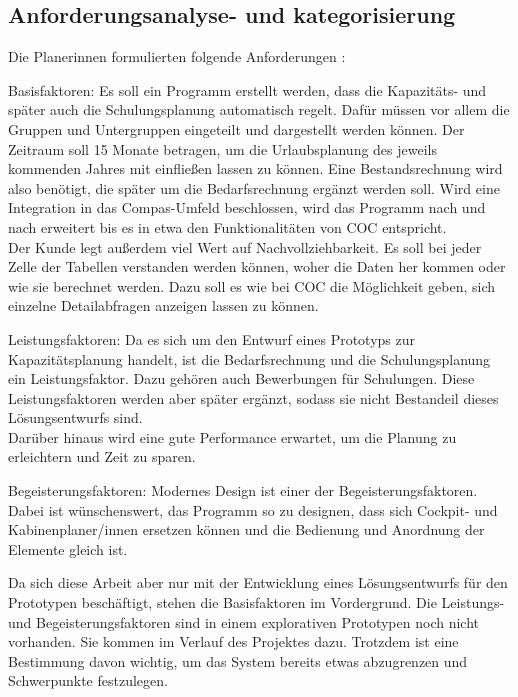 \documentclass [12pt, a4paper, oneside, titlepage, ngerman]{article}
\begin{document}
\subsection{Anforderungsanalyse- und kategorisierung}
Die Planerinnen formulierten folgende Anforderungen \cite[vgl.][]{Gespraech2}:
\begin{description}
\item Basisfaktoren: Es soll ein Programm erstellt werden, dass die Kapazitäts- und später auch die Schulungsplanung automatisch regelt. Dafür müssen vor allem die Gruppen und Untergruppen eingeteilt und dargestellt werden können. Der Zeitraum soll 15 Monate betragen, um die Urlaubsplanung des jeweils kommenden Jahres mit einfließen lassen zu können. Eine Bestandsrechnung wird also benötigt, die später um die Bedarfsrechnung ergänzt werden soll. Wird eine Integration in das Compas-Umfeld beschlossen, wird das Programm nach und nach erweitert bis es in etwa den Funktionalitäten von \ac{COC} entspricht. \\
Der Kunde legt außerdem viel Wert auf Nachvollziehbarkeit. Es soll bei jeder Zelle der Tabellen verstanden werden können, woher die Daten her kommen oder wie sie berechnet werden. Dazu soll es wie bei \ac{COC} die Möglichkeit geben, sich einzelne Detailabfragen anzeigen lassen zu können.
\item Leistungsfaktoren: Da es sich um den Entwurf eines Prototyps zur Kapazitätsplanung handelt, ist die Bedarfsrechnung und die Schulungsplanung ein Leistungsfaktor. Dazu gehören auch Bewerbungen für Schulungen. Diese Leistungsfaktoren werden aber später ergänzt, sodass sie nicht Bestandeil dieses Lösungsentwurfs sind. \\
Darüber hinaus wird eine gute Performance erwartet, um die Planung zu erleichtern und Zeit zu sparen.
\item Begeisterungsfaktoren: Modernes Design ist einer der Begeisterungsfaktoren. Dabei ist wünschenswert, das Programm so zu designen, dass sich Cockpit- und Kabinenplaner/innen ersetzen können und die Bedienung und Anordnung der Elemente gleich ist. 
\end{description}
Da sich diese Arbeit aber nur mit der Entwicklung eines Lösungsentwurfs für den Prototypen beschäftigt, stehen die Basisfaktoren im Vordergrund. Die Leistungs- und Begeisterungsfaktoren sind in einem explorativen Prototypen noch nicht vorhanden. Sie kommen im Verlauf des Projektes dazu. Trotzdem ist eine Bestimmung davon wichtig, um das System bereits etwas abzugrenzen und Schwerpunkte festzulegen.
\end{document}
